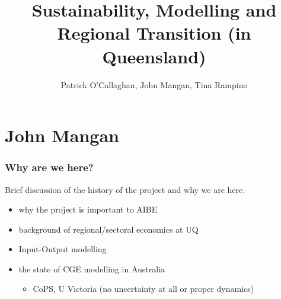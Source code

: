 \documentclass[handout,english]{beamer}
\title{Sustainability, Modelling and Regional Transition (in Queensland)}
\author[Patrick O'Callaghan]{Patrick O'Callaghan, John Mangan, Tina Rampino}
\institute{AIBE, The University of Queensland\\
\today}
\date{}
\begin{document}
\maketitle
\section{John Mangan}
\begin{frame}
  \frametitle{Why are we here?}
  Brief discussion of the history of the project and why we are here.
  \begin{itemize}
    \item why the project is important to AIBE\\
    \item background of regional/sectoral economics at UQ\\
    \item Input-Output modelling\\
    \item the state of CGE modelling in Australia\\
    \begin{itemize}
      \item CoPS, U Victoria (no uncertainty at all or proper dynamics)\\
    \end{itemize}
  \end{itemize}
\end{frame}
\end{document}
